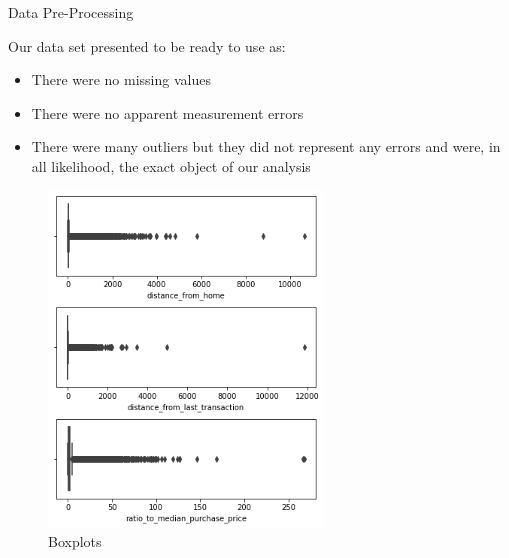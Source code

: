 \begin{frame}{Data Pre-Processing}

    \begin{minipage}{0.5\textwidth}
          Our data set presented to be ready to use as:
        \begin{itemize}
            \item There were no missing values
            \item There were no apparent measurement errors
            \item There were many outliers but they did not represent any errors and were, in all likelihood, the exact object of our analysis
        \end{itemize}
    \end{minipage}%
    \begin{minipage}{0.5\textwidth}
        \begin{figure}
            \centering
            \includegraphics[width=0.65\textwidth]{images/boxplots.png}
            \caption{Boxplots}
            \label{fig:my_label}
        \end{figure}
    \end{minipage}

\end{frame}

